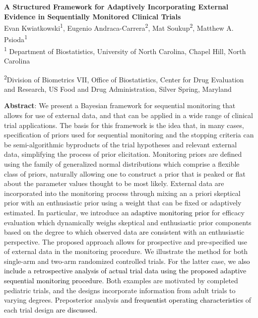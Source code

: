 \documentclass[12pt]{article}
\begin{document}
	\begin{center}
		\textbf{A Structured Framework for Adaptively Incorporating External\\ 
		         Evidence in Sequentially Monitored Clinical Trials} \\

		\vspace{1cm}
			Evan Kwiatkowski\textsuperscript{1}, Eugenio Andraca-Carrera\textsuperscript{2}, 
			Mat Soukup\textsuperscript{2}, Matthew A. Psioda\textsuperscript{1}\\

		\vspace{1cm}
			\textsuperscript{1} Department of Biostatistics, University of North Carolina, Chapel Hill, North Carolina

		\vspace{1cm}
			\textsuperscript{2}{Division of Biometrics VII, Office of Biostatistics, Center for Drug Evaluation and Research, US Food and Drug Administration, Silver Spring, Maryland}
	\end{center}


\vspace{1.5cm}
\noindent
\textbf{Abstract}:
{We present a Bayesian framework for sequential monitoring that allows for use of external data, and that 
can be applied in a wide range of clinical trial applications. The basis for this framework is the 
idea that, in many cases, specification of priors used for sequential monitoring and the stopping criteria can be semi-algorithmic byproducts of the trial hypotheses and relevant external data, simplifying the process of prior elicitation. Monitoring priors are defined using the family of generalized normal distributions which comprise a flexible class of priors, naturally allowing one to construct a prior that is peaked or flat about the parameter values thought to be most likely. External data are incorporated into the monitoring process through mixing an a priori skeptical prior with an enthusiastic prior using a weight that can be fixed or adaptively estimated. In particular, we introduce an \textcolor{black}{adaptive monitoring prior} for efficacy evaluation which dynamically weighs skeptical and enthusiastic prior components based on the degree to which observed data \textcolor{black}{are} consistent with an enthusiastic perspective. The proposed approach allows for prospective and pre-specified use of external data in the monitoring procedure.
%
We illustrate the method for both single-arm and two-arm randomized controlled trials. For the latter case, we \textcolor{black}{also include a retrospective analysis of actual trial data using the proposed adaptive sequential monitoring procedure}. Both examples are motivated by completed pediatric trials, and the designs incorporate information from adult trials to varying degrees. Preposterior analysis \textcolor{black}{and frequentist operating characteristics} of each trial design \textcolor{black}{are discussed.}}
\end{document}
